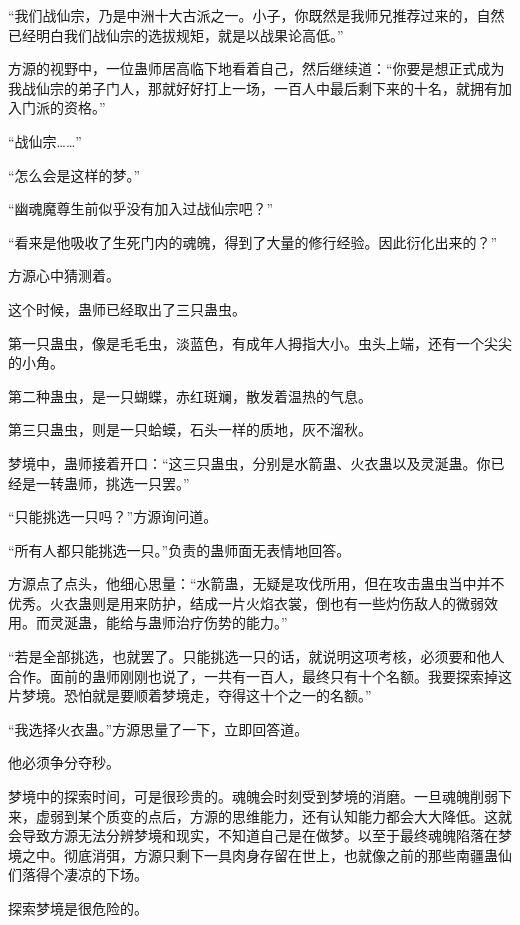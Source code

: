 
\begin{this_body}

“我们战仙宗，乃是中洲十大古派之一。小子，你既然是我师兄推荐过来的，自然已经明白我们战仙宗的选拔规矩，就是以战果论高低。”

方源的视野中，一位蛊师居高临下地看着自己，然后继续道：“你要是想正式成为我战仙宗的弟子门人，那就好好打上一场，一百人中最后剩下来的十名，就拥有加入门派的资格。”

“战仙宗……”

“怎么会是这样的梦。”

“幽魂魔尊生前似乎没有加入过战仙宗吧？”

“看来是他吸收了生死门内的魂魄，得到了大量的修行经验。因此衍化出来的？”

方源心中猜测着。

这个时候，蛊师已经取出了三只蛊虫。

第一只蛊虫，像是毛毛虫，淡蓝色，有成年人拇指大小。虫头上端，还有一个尖尖的小角。

第二种蛊虫，是一只蝴蝶，赤红斑斓，散发着温热的气息。

第三只蛊虫，则是一只蛤蟆，石头一样的质地，灰不溜秋。

梦境中，蛊师接着开口：“这三只蛊虫，分别是水箭蛊、火衣蛊以及灵涎蛊。你已经是一转蛊师，挑选一只罢。”

“只能挑选一只吗？”方源询问道。

“所有人都只能挑选一只。”负责的蛊师面无表情地回答。

方源点了点头，他细心思量：“水箭蛊，无疑是攻伐所用，但在攻击蛊虫当中并不优秀。火衣蛊则是用来防护，结成一片火焰衣裳，倒也有一些灼伤敌人的微弱效用。而灵涎蛊，能给与蛊师治疗伤势的能力。”

“若是全部挑选，也就罢了。只能挑选一只的话，就说明这项考核，必须要和他人合作。面前的蛊师刚刚也说了，一共有一百人，最终只有十个名额。我要探索掉这片梦境。恐怕就是要顺着梦境走，夺得这十个之一的名额。”

“我选择火衣蛊。”方源思量了一下，立即回答道。

他必须争分夺秒。

梦境中的探索时间，可是很珍贵的。魂魄会时刻受到梦境的消磨。一旦魂魄削弱下来，虚弱到某个质变的点后，方源的思维能力，还有认知能力都会大大降低。这就会导致方源无法分辨梦境和现实，不知道自己是在做梦。以至于最终魂魄陷落在梦境之中。彻底消弭，方源只剩下一具肉身存留在世上，也就像之前的那些南疆蛊仙们落得个凄凉的下场。

探索梦境是很危险的。


\end{this_body}
